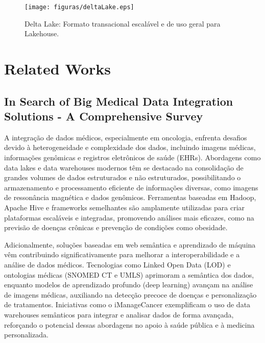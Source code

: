 \begin{figure}[H]
    \centering
    \texttt{[image: figuras/deltaLake.eps]}
    \caption{Delta Lake: Formato transacional escalável e de uso geral para Lakehouse. \cite{lee2024delta}}
    \label{fig:pipeline_proc}
\end{figure}

\section{Related Works}
\subsection{In Search of Big Medical Data Integration Solutions - A Comprehensive Survey}
A integração de dados médicos, especialmente em oncologia, enfrenta desafios devido à heterogeneidade e complexidade dos dados, 
incluindo imagens médicas, informações genômicas e registros eletrônicos de saúde (EHRs). Abordagens como data lakes e data 
warehouses modernos têm se destacado na consolidação de grandes volumes de dados estruturados e não estruturados, possibilitando o
 armazenamento e processamento eficiente de informações diversas, como imagens de ressonância magnética e dados genômicos. Ferramentas 
 baseadas em Hadoop, Apache Hive e frameworks semelhantes são amplamente utilizadas para criar plataformas escaláveis e integradas, 
 promovendo análises mais eficazes, como na previsão de doenças crônicas e prevenção de condições como obesidade. \cite{dhayne2019}

Adicionalmente, soluções baseadas em web semântica e aprendizado de máquina vêm contribuindo significativamente para melhorar a 
interoperabilidade e a análise de dados médicos. Tecnologias como Linked Open Data (LOD) e ontologias médicas (SNOMED CT e UMLS) 
aprimoram a semântica dos dados, enquanto modelos de aprendizado profundo (deep learning) avançam na análise de imagens médicas, 
auxiliando na detecção precoce de doenças e personalização de tratamentos. Iniciativas como o iManageCancer exemplificam o uso de 
data warehouses semânticos para integrar e analisar dados de forma avançada, reforçando o potencial dessas abordagens no apoio à 
saúde pública e à medicina personalizada. \cite{dhayne2019}

